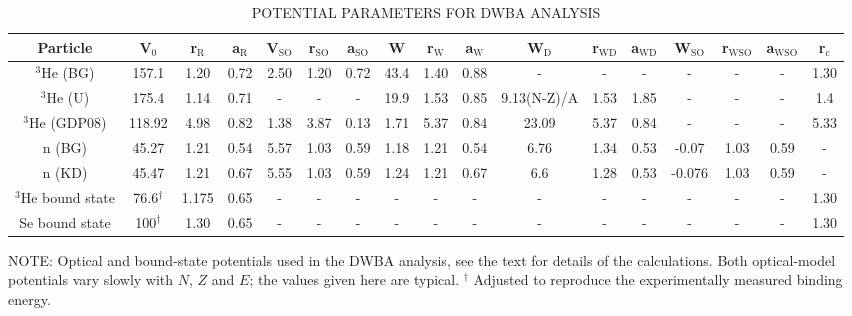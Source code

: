 \begin{table}\footnotesize
\caption[\uppercase{potential parameters for DWBA analysis}]{\label{tab:typicalPotentials} \uppercase{potential parameters for DWBA analysis}}
\begin{tabular}{ccccccccccccccccc}
\hline
Particle & V$_0$ & r$_{\text{R}}$ & a$_{\text{R}}$ & V$_{\text{SO}}$ & r$_{\text{SO}}$ & a$_{\text{SO}}$ & W & r$_{\text{W}}$ & a$_{\text{W}}$ & W$_{\text{D}}$ & r$_{\text{WD}}$ & a$_{\text{WD}}$ & W$_{\text{SO}}$ & r$_{\text{WSO}}$ & a$_{\text{WSO}}$ & r$_{\text{c}}$ \\
\hline
$^{3}$He (BG) & 157.1 & 1.20 & 0.72 & 2.50 & 1.20 & 0.72 & 43.4 & 1.40 & 0.88 & - & - & - & - & - & - & 1.30\\
$^{3}$He (U) & 175.4 & 1.14 & 0.71 & - & - & - & 19.9 & 1.53 & 0.85 & 9.13(N-Z)/A & 1.53 & 1.85 & - & - & - & 1.4\\
$^{3}$He (GDP08) & 118.92 & 4.98 & 0.82 & 1.38 & 3.87 & 0.13 & 1.71 & 5.37 & 0.84 & 23.09 & 5.37 & 0.84 & - & - & - & 5.33\\

n (BG) & 45.27 & 1.21 & 0.54 & 5.57 & 1.03 & 0.59 & 1.18 & 1.21 & 0.54 & 6.76 & 1.34 & 0.53 & -0.07 & 1.03 & 0.59 & -\\
n (KD) & 45.47 & 1.21 & 0.67 & 5.55 & 1.03 & 0.59 & 1.24 & 1.21 & 0.67 & 6.6 & 1.28 & 0.53 & -0.076 & 1.03 & 0.59 & -\\

$^3$He bound state & 76.6$^{\dagger}$ & 1.175 & 0.65 & - & - & - & - & - & - & - & - & - & - & - & - & 1.30\\

Se bound state & 100$^{\dagger}$ & 1.30 & 0.65 & - & - & - & - & - & - & - & - & - & - & - & - & 1.30\\
\hline
\end{tabular}
\begin{flushleft}
\small NOTE:
Optical and bound-state potentials used in the DWBA analysis, see the text for details of the calculations. Both optical-model potentials vary slowly with $N$, $Z$ and $E$; the values given here are typical. $^{\dagger}$ Adjusted to reproduce the experimentally measured binding energy.
\end{flushleft}
\end{table}
